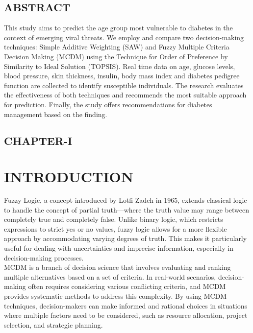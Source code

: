 \documentclass[12pt,a4paper]{article}
\begin{document}
\pagenumbering{}

\newpage
\begin{center}
    \section*{ABSTRACT}
\end{center}
\hspace{1em}This study aims to predict the age group most vulnerable to diabetes in the context of emerging viral threats. We employ and compare two decision-making techniques: Simple Additive Weighting (SAW) and Fuzzy Multiple Criteria Decision Making (MCDM) using the Technique for Order of Preference by Similarity to Ideal Solution (TOPSIS). Real time data on age, glucose levels, blood pressure, skin thickness, insulin, body mass index and diabetes pedigree function are collected to identify susceptible individuals. The research evaluates the effectiveness of both techniques and recommends the most suitable approach for prediction. Finally, the study offers recommendations for diabetes management based on the finding.

\newpage
\tableofcontents
\newpage
{}
\begin{center}
    \section*{CHAPTER-I}
\end{center}
\section{INTRODUCTION}
\hspace{3em}Fuzzy Logic, a concept introduced by Lotfi Zadeh in 1965, extends classical logic to handle the concept of partial truth—where the truth value may range between completely true and completely false. Unlike binary logic, which restricts expressions to strict yes or no values, fuzzy logic allows for a more flexible approach by accommodating varying degrees of truth. This makes it particularly useful for dealing with uncertainties and imprecise information, especially in decision-making processes.\\

MCDM is a branch of decision science that involves evaluating and ranking multiple alternatives based on a set of criteria. In real-world scenarios, decision-making often requires considering various conflicting criteria, and MCDM provides systematic methods to address this complexity. By using MCDM techniques, decision-makers can make informed and rational choices in situations where multiple factors need to be considered, such as resource allocation, project selection, and strategic planning.\\
\end{document}
